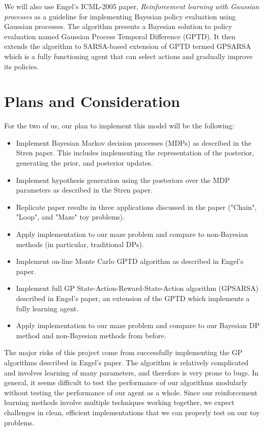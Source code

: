 \documentclass[11pt, twoside]{article}
\begin{document}
We will also use Engel's ICML-2005 paper, \textit{Reinforcement learning with Gaussian processes} as a guideline for implementing Bayesian policy evaluation using Gaussian processes. The algorithm presents a Bayesian solution to policy evaluation named Gaussian Process Temporal Difference (GPTD). It then extends the algorithm to SARSA-based extension of GPTD termed GPSARSA which is a fully functioning agent that can select actions and gradually improve its policies.

\section{Plans and Consideration}

For the two of us, our plan to implement this model will be the following:

\begin{itemize}
\item Implement Bayesian Markov decision processes (MDPs) as described in the Stren paper. This includes implementing the representation of the posterior, generating the prior, and posterior updates.
\item Implement hypothesis generation using the posteriors over the MDP parameters as described in the Stren paper.
\item Replicate paper results in three applications discussed in the paper ("Chain", "Loop", and "Maze" toy problems).
\item Apply implementation to our maze problem and compare to non-Bayesian methods (in particular, traditional DPs).
\item Implement on-line Monte Carlo GPTD algorithm as described in Engel's paper.
\item Implement full GP State-Action-Reward-State-Action algorithm (GPSARSA) described in Engel's paper, an extension of the GPTD which implements a fully learning agent.
\item Apply implementation to our maze problem and compare to our Bayesian DP method and non-Bayesian methods from before.

\end{itemize}


The major risks of this project come from successfully implementing the GP algorithms described in Engel's paper. The algorithm is relatively complicated and involves learning of many parameters, and therefore is very prone to bugs. In general, it seems difficult to test the performance of our algorithms modularly without testing the performance of our agent as a whole. Since our reinforcement learning methods involve multiple techniques working together, we expect challenges in clean, efficient implementations that we can properly test on our toy problems.



\end{document}
